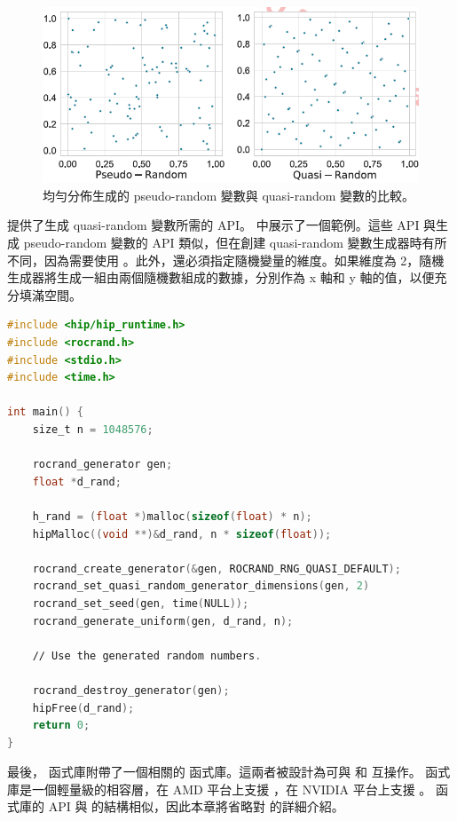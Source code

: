 \begin{figure}[h]
    \centering
    \includegraphics[width=0.7\linewidth]{FileAusiliari/Screenshots/Figure9-3.png}
    \caption{均勻分佈生成的 pseudo-random 變數與 quasi-random 變數的比較。}
    \label{fig:random}
\end{figure}

 提供了生成 quasi-random 變數所需的 API。 中展示了一個範例。這些 API 與生成 pseudo-random 變數的 API 類似，但在創建 quasi-random 變數生成器時有所不同，因為需要使用 。此外，還必須指定隨機變量的維度。如果維度為 2，隨機生成器將生成一組由兩個隨機數組成的數據，分別作為 x 軸和 y 軸的值，以便充分填滿空間。

\begin{lstlisting}[language=C, caption={一個生成 100 萬個 pseudo-random 變數的 \term{rocRAND} 函式。}, captionpos=t, label={lst:quasi}]
#include <hip∕hip_runtime.h>
#include <rocrand.h>
#include <stdio.h>
#include <time.h>

int main() {
    size_t n = 1048576;

    rocrand_generator gen;
    float *d_rand;

    h_rand = (float *)malloc(sizeof(float) * n);
    hipMalloc((void **)&d_rand, n * sizeof(float));

    rocrand_create_generator(&gen, ROCRAND_RNG_QUASI_DEFAULT);
    rocrand_set_quasi_random_generator_dimensions(gen, 2)
    rocrand_set_seed(gen, time(NULL));
    rocrand_generate_uniform(gen, d_rand, n);

    ∕∕ Use the generated random numbers.

    rocrand_destroy_generator(gen);
    hipFree(d_rand);
    return 0;
}
\end{lstlisting}

最後， 函式庫附帶了一個相關的  函式庫。這兩者被設計為可與  和  互操作。 函式庫是一個輕量級的相容層，在 AMD 平台上支援 ，在 NVIDIA 平台上支援 。 函式庫的 API 與  的結構相似，因此本章將省略對  的詳細介紹。

